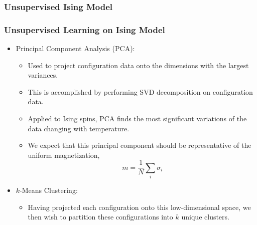 \documentclass{beamer}
\begin{document}
\subsubsection{Unsupervised Ising Model}
\begin{frame}
\frametitle{Unsupervised Learning on Ising Model}
	\begin{itemize}
		\item Principal Component Analysis (PCA):
			\begin{itemize}
				\item Used to project configuration data onto the dimensions with the largest variances.
				\item This is accomplished by performing SVD decomposition on configuration data.
				\item Applied to Ising spins, PCA finds the most significant variations of the data changing with temperature.
				\item We expect that this principal component should be representative of the uniform magnetization,
					\begin{equation}
						m = \frac{1}{N}\sum_i \sigma_i
					\end{equation}
			\end{itemize}

		\item $k$-Means Clustering:
			\begin{itemize}
				\item Having projected each configuration onto this low-dimensional space, we then wish to partition
					these configurations into $k$ unique clusters.
				\end{itemize}
	\end{itemize}
\end{frame}
\end{document}
